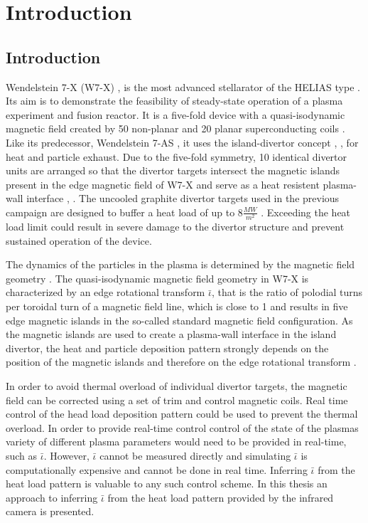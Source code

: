 %
\chapter{Introduction}
\label{sec:intro}

\section{Introduction}
Wendelstein 7-X (W7-X) \cite{Beidler1990},\cite{Klinger2013} is the most advanced stellarator of the HELIAS type \cite{Nuhrenberg1986}. Its aim is to demonstrate the feasibility of steady-state operation of a plasma experiment and fusion reactor. It is a five-fold device with a quasi-isodynamic magnetic field created by 50 non-planar and 20 planar superconducting coils \cite{Rummel2012}. Like its predecessor, Wendelstein 7-AS \cite{Hirsch2008}, it uses the island-divertor concept \cite{Renner2004}, \cite{Konig2002}, \cite{Grigull2001} for heat and particle exhaust. Due to the five-fold symmetry, 10 identical divertor units are arranged so that the divertor targets intersect the magnetic islands present in the edge magnetic field of W7-X and serve as a heat resistent plasma-wall interface \cite{Boscary2021}, \cite{Boscary2017}. The uncooled graphite divertor targets used in the previous campaign \cite{Pedersen2019} are designed to buffer a heat load of up to $8 \frac{MW}{m^2}$ \cite{Gao2019}. Exceeding the heat load limit could result in severe damage to the divertor structure and prevent sustained operation of the device.

The dynamics of the particles in the plasma is determined by the magnetic field geometry \cite{Helander2014}. The quasi-isodynamic magnetic field geometry in W7-X is characterized by an edge rotational transform $\bar{\iota}$, that is the ratio of polodial turns per toroidal turn of a magnetic field line, which is close to 1 and results in five edge magnetic islands in the so-called standard magnetic field configuration. As the magnetic islands are used to create a plasma-wall interface in the island divertor, the heat and particle deposition pattern strongly depends on the position of the magnetic islands and therefore on the edge rotational transform \cite{Lazerson2016}.

In order to avoid thermal overload of individual divertor targets, the magnetic field can be corrected using a set of trim and control magnetic coils. Real time control of the head load deposition pattern could be used to prevent the thermal overload. In order to provide real-time control control of the state of the plasmas variety of different plasma parameters would need to be provided in real-time, such as $\bar{\iota}$. However, $\bar{\iota}$ cannot be measured directly and simulating $\bar{\iota}$ is computationally expensive and cannot be done in real time. Inferring $\bar{\iota}$ from the heat load pattern is valuable to any such control scheme. In this thesis an approach to inferring $\bar{\iota}$ from the heat load pattern provided by the infrared camera is presented.

